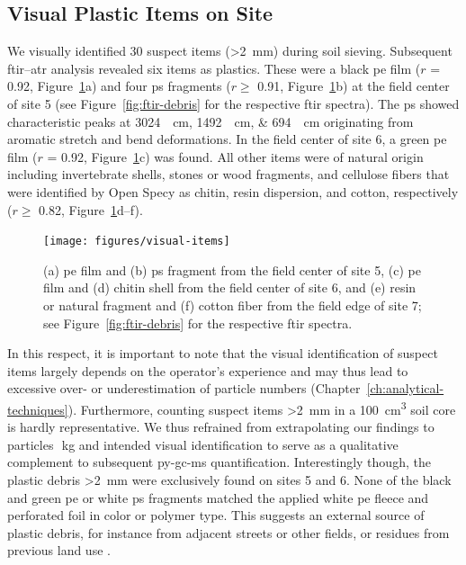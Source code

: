 \subsection{Visual Plastic Items on Site}

We visually identified 30 suspect items (\SI{>2}{\milli\meter}) during soil sieving. Subsequent \ac{ftir}--\ac{atr} analysis revealed six items as plastics. These were a black \ac{pe} film ($r$ = 0.92, Figure~\ref{fig:visual-items}a) and four \ac{ps} fragments ($r \geq$ 0.91, Figure~\ref{fig:visual-items}b) at the field center of site 5 (see Figure~\ref{fig:ftir-debris} for the respective \ac{ftir} spectra). The \ac{ps} showed characteristic peaks at \SIlist{3024;1492;694}{\per\centi\meter} originating from aromatic  stretch and bend deformations. In the field center of site 6, a green \ac{pe} film ($r$ = 0.92, Figure~\ref{fig:visual-items}c) was found. All other items were of natural origin including invertebrate shells, stones or wood fragments, and cellulose fibers that were identified by Open Specy as chitin, resin dispersion, and cotton, respectively ($r \geq$ 0.82, Figure~\ref{fig:visual-items}d--f).

\begin{figure}
	\centering
	\texttt{[image: figures/visual-items]}
	\caption[Exemplary photographs of suspect particles \SI{>2}{\milli\meter}.]{(a) \ac{pe} film and (b) \ac{ps} fragment from the field center of site 5, (c) \ac{pe} film and (d) chitin shell from the field center of site 6, and (e) resin or natural fragment and (f) cotton fiber from the field edge of site 7; see Figure~\protect\ref{fig:ftir-debris} for the respective \ac{ftir} spectra.}
	\label{fig:visual-items}
\end{figure}

In this respect, it is important to note that the visual identification of suspect items largely depends on the operator's experience and may thus lead to excessive over- or underestimation of particle numbers (Chapter~\ref{ch:analytical-techniques}). Furthermore, counting suspect items \SI{>2}{\milli\meter} in a \SI{100}{\cubic\centi\meter} soil core is hardly representative. We thus refrained from extrapolating our findings to particles\,\si{\per\kilo\gram} and intended visual identification to serve as a qualitative complement to subsequent \ac{py-gc-ms} quantification.
Interestingly though, the plastic debris \SI{>2}{\milli\meter} were exclusively found on sites 5 and 6. None of the black and green \ac{pe} or white \ac{ps} fragments matched the applied white \ac{pe} fleece and perforated foil in color or polymer type. This suggests an external source of plastic debris, for instance from adjacent streets or other fields, or residues from previous land use \citep{HarmsAmount2021}.

